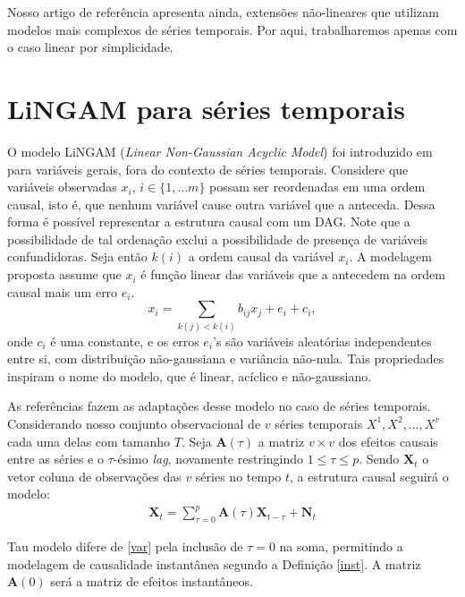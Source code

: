 \documentclass[12pt,letterpaper]{article}
\newcommand{\bd}[1]{\boldsymbol{#1}}
\begin{document}
	Nosso artigo de referência apresenta ainda, extensões não-lineares que utilizam modelos mais complexos de séries temporais. Por aqui, trabalharemos apenas com o caso linear por simplicidade.
	
	\section{LiNGAM para séries temporais}
	
	O modelo LiNGAM (\textit{Linear Non-Gaussian Acyclic Model}) foi introduzido em \cite{lingam} para variáveis gerais, fora do contexto de séries temporais. Considere que variáveis observadas $x_i$, $i\in\{1,\ldots m\}$ possam ser reordenadas em uma ordem causal, isto é, que nenhum variável cause outra variável que a anteceda. Dessa forma é possível representar a estrutura causal com um DAG. Note que a possibilidade de tal ordenação exclui a possibilidade de presença de variáveis confundidoras. Seja então $k(i)$ a ordem causal da variável $x_i$. A modelagem proposta assume que $x_i$ é função linear das variáveis que a antecedem na ordem causal mais um erro $e_i$.
	$$\displaystyle x_i=\sum_{k(j)<k(i)}b_{ij}x_j+e_i+c_i,$$
	onde $c_i$ é uma constante, e os erros $e_i$'s são variáveis aleatórias independentes entre si, com distribuição não-gaussiana e variância não-nula. Tais propriedades inspiram o nome do modelo, que é linear, acíclico e não-gaussiano.
	
	As referências \cite{tslingam}\cite{tsling2} fazem as adaptações desse modelo no caso de séries temporais. Considerando nosso conjunto observacional de $v$ séries temporais $X^1,X^2,\ldots,X^v$ cada uma delas com tamanho $T$. Seja $\bd A(\tau)$ a matriz $v\times v$ dos efeitos causais entre as séries e o $\tau$-ésimo \textit{lag}, novamente restringindo $1\leq\tau \leq p$. Sendo $\bd X_t$ o vetor coluna de observações das $v$ séries no tempo $t$, a estrutura causal seguirá o modelo:
	\begin{align}\label{ling}
		\displaystyle \bd X_t=\sum_{\tau=0}^p \bd A(\tau)\bd X_{t-\tau}+\bd N_t
	\end{align}
	
	Tau modelo difere de \ref{var} pela inclusão de $\tau=0$ na soma, permitindo a modelagem de causalidade instantânea segundo a Definição \ref{inst}. A matriz $\bd A(0)$ será a matriz de efeitos instantâneos. 
	
\end{document}
